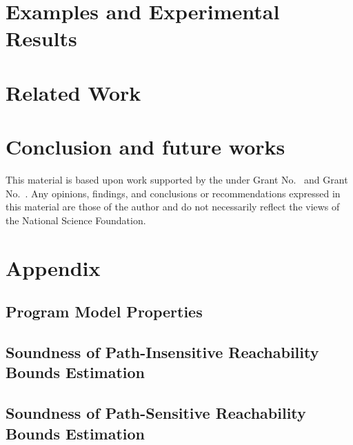 \documentclass[acmsmall]{acmart}
\begin{document}
\section{Examples and Experimental Results}
\label{sec:example}

\section{Related Work}
% 

\section{Conclusion and future works}
% 


\begin{acks}
This material is based upon work supported by the
 under Grant
No.~ and Grant
No.~.  Any opinions, findings, and
conclusions or recommendations expressed in this material are those
of the author and do not necessarily reflect the views of the
National Science Foundation.
\end{acks}





\appendix

\section{Appendix}
\subsection{Program Model Properties}
\label{apdx:lemma_sec123}
% 

\subsection{Soundness of Path-Insensitive Reachability Bounds Estimation}
\label{apdx:pathinsensitive_rb_soundness}
% 

\subsection{Soundness of Path-Sensitive Reachability Bounds Estimation}
\label{apdx:pathsensitive_rb_soundness}
\end{document}
